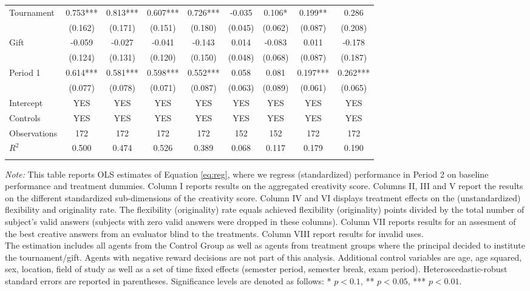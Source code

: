 \begin{landscape}
\begin{table}
\begin{center}
{\begin{tabular}{lcccccccc}
Tournament & 0.753*** & 0.813*** & 0.607*** & 0.726*** & -0.035 & 0.106* & 0.199** & 0.286\\
&(0.162) &(0.171) & (0.151) & (0.180) & (0.045) & (0.062) & (0.087) & (0.208)\\[4mm]
Gift & -0.059 & -0.027 & -0.041 & -0.143 & 0.014 & -0.083 & 0.011 & -0.178\\
&(0.124) &(0.131) & (0.120) & (0.150) & (0.048) & (0.068) & (0.087) & (0.187)\\[4mm]
Period 1 & 0.614*** & 0.581*** & 0.598*** & 0.552*** & 0.058 & 0.081 & 0.197*** & 0.262***\\
&(0.077) &(0.078) & (0.071) & (0.087) & (0.063) & (0.089) & (0.061) & (0.065)\\
\noalign{\smallskip}\hline\noalign{\smallskip}
Intercept         	&		YES		&		YES		&		       YES   		&		 YES 		&		 YES 		&		 YES 		&			 YES 	&		 YES 		\\	\hline
Controls           	&		YES		&		YES		&		       YES   		&		 YES 		&		 YES 		&		 YES 		&			 YES 	&		 YES 		\\	\hline
Observations 	&		172		&		172		&		172		&		172		&		152		&		152		&		172		&		172		\\	
$R^2$        	&		0.500		&		0.474		&		0.526		&		0.389		&		0.068		&		0.117		&		0.179		&		0.190		\\	
\hline\hline\noalign{\medskip}
\end{tabular}}
\begin{minipage}{1.25\textwidth}
\footnotesize
{\it Note:} This table reports OLS estimates of Equation \ref{eq:reg}, where we regress (standardized) performance in Period 2 on baseline performance and treatment dummies. Column I reports results on the aggregated creativity score. Columns II, III and V report the results on the different standardized sub-dimensions of the creativity score.  Column IV and VI displays treatment effects on the (unstandardized) flexibility and originality rate. The flexibility (originality) rate equals achieved flexibility (originality) points divided by the total number of subject's valid answers (subjects with zero valid answers were dropped in these columns). Column VII reports results for an assesment of the best creative answers from an evaluator blind to the treatments. Column VIII report results for invalid uses.\\
The estimation includes all agents from the Control Group as well as agents from treatment groups where the principal decided to institute the tournament/gift. Agents with negative reward decisions are not part of this analysis. Additional control variables are age, age squared, sex, location, field of study as well as a set of time fixed  effects (semester period, semester break, exam period). Heteroscedastic-robust standard errors are reported in parentheses. Significance levels are denoted as follows: * $p < 0.1$, ** $p < 0.05$, *** $p < 0.01$.

\end{minipage}
\end{center}
\end{table}
\end{landscape}
